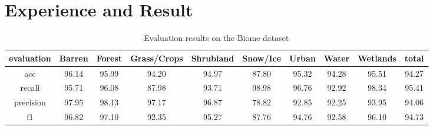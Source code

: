 \documentclass[UTF8]{ctexart}
\begin{document}
\section[]{Experience and Result}

\begin{table}[ht]
    \centering
    \begin{tabular}{c|ccccccccc}
    \hline
    \hline
    evaluation& Barren& Forest& Grass/Crops& Shrubland& Snow/Ice& Urban& Water&  Wetlands& total\\
    \hline
    acc&	    96.14& 95.99& 94.20 & 94.97& 87.80& 95.32& 94.28& 95.51& 94.27\\
    recall&     95.71& 96.08& 87.98 & 93.71& 98.98& 96.76& 92.92& 98.34& 95.41\\
    precision&  97.95& 98.13& 97.17 & 96.87& 78.82& 92.85& 92.25& 93.95& 94.06\\
    f1&         96.82& 97.10& 92.35 & 95.27& 87.76& 94.76& 92.58& 96.10& 94.73\\
    \hline
    \hline
    \end{tabular}
    \caption{Evaluation results on the Biome dataset}
    \end{table}


\end{document}
